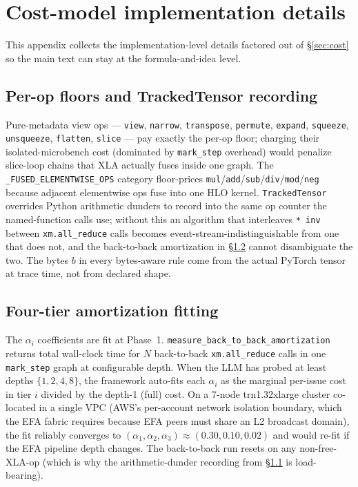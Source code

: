 \section{Cost-model implementation details}
\label{sec:cost-impl}

This appendix collects the implementation-level details factored
out of §\ref{sec:cost} so the main text can stay at the
formula-and-idea level.

\subsection{Per-op floors and TrackedTensor recording}
\label{sec:cost-impl-local}

Pure-metadata view ops --- \texttt{view}, \texttt{narrow},
\texttt{transpose}, \texttt{permute}, \texttt{expand},
\texttt{squeeze}, \texttt{unsqueeze}, \texttt{flatten},
\texttt{slice} --- pay exactly the per-op floor; charging their
isolated-microbench cost (dominated by \texttt{mark\_step}
overhead) would penalize slice-loop chains that XLA actually fuses
inside one graph. The
\texttt{\_FUSED\_ELEMENTWISE\_OPS} category
floor-prices \texttt{mul}/\texttt{add}/\texttt{sub}/\texttt{div}/\texttt{mod}/\texttt{neg}
because adjacent elementwise ops fuse into one HLO kernel.
\texttt{TrackedTensor} overrides Python arithmetic dunders to
record into the same op counter the named-function calls use;
without this an algorithm that interleaves \texttt{*\,inv} between
\texttt{xm.all\_reduce} calls becomes event-stream-indistinguishable
from one that does not, and the back-to-back amortization in
§\ref{sec:cost-impl-coll} cannot disambiguate the two. The bytes
$b$ in every bytes-aware rule come from the actual PyTorch tensor
at trace time, not from declared shape.

\subsection{Four-tier amortization fitting}
\label{sec:cost-impl-coll}

The $\alpha_i$ coefficients are fit at Phase~1.
\texttt{measure\_back\_to\_back\_amortization}
returns total wall-clock time for $N$ back-to-back
\texttt{xm.all\_reduce} calls in one \texttt{mark\_step} graph at
configurable depth. When the LLM has probed at least depths
$\{1, 2, 4, 8\}$, the framework auto-fits each $\alpha_i$ as the
marginal per-issue cost in tier $i$ divided by the depth-1 (full)
cost. On a 7-node trn1.32xlarge cluster co-located in a single VPC
(AWS's per-account network isolation boundary, which the EFA
fabric requires because EFA peers must share an L2 broadcast
domain), the fit reliably converges to
$(\alpha_1, \alpha_2, \alpha_3) \approx (0.30, 0.10, 0.02)$ and
would re-fit if the EFA pipeline depth changes. The back-to-back
run resets on any non-free-XLA-op (which is why the
arithmetic-dunder recording from §\ref{sec:cost-impl-local} is
load-bearing).

